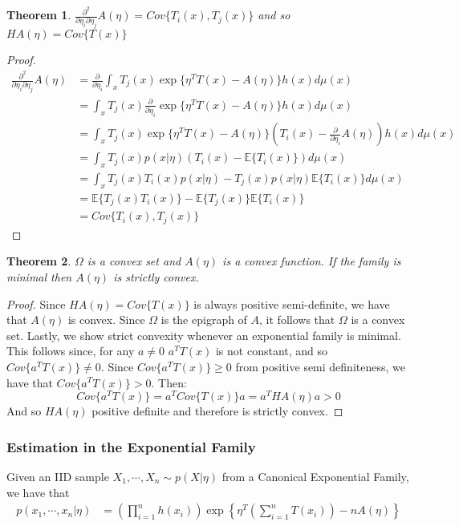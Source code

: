 \documentclass[]{article}
\theoremstyle{mattstyle}
\newtheorem{theorem}{Theorem}[section]
\theoremstyle{definition}
\begin{document}
\begin{theorem}
	$\frac{\partial^2}{\partial \eta_i \partial \eta_j}A(\eta) = Cov\{T_i(x),T_j(x)\}$ and so $HA(\eta)=Cov\{T(x)\}$
\end{theorem}
\begin{proof}
	\begin{align*}
	\frac{\partial^2}{\partial \eta_i \partial \eta_j}A(\eta) &= \frac{\partial}{\partial \eta_i}\int_x T_j(x)\exp\{ \eta^TT(x)-A(\eta)\}h(x)d\mu(x)\\
	&= \int_x T_j(x)\frac{\partial}{\partial \eta_i}\exp\{ \eta^TT(x)-A(\eta)\}h(x)d\mu(x)\\
	&= \int_x T_j(x)\exp\{ \eta^TT(x)-A(\eta)\}\left( T_i(x) - \frac{\partial}{\partial \eta_i}A(\eta) \right)h(x)d\mu(x)\\
	&= \int_x T_j(x)p(x|\eta)\left( T_i(x) - \mathbb{E}\{T_i(x)\} \right) d\mu(x)\\
	&= \int_x T_j(x)T_i(x)p(x|\eta) - T_j(x)p(x|\eta)\mathbb{E}\{T_i(x)\} d\mu(x)\\
	&= \mathbb{E}\{T_j(x)T_i(x)\} - \mathbb{E}\{T_j(x)\}\mathbb{E}\{T_i(x)\}\\
	&= Cov\{T_i(x), T_j(x)\}
	\end{align*}
\end{proof}

\begin{theorem}
	$\Omega$ is a convex set and $A(\eta)$ is a convex function. If the family is minimal then $A(\eta)$ is strictly convex.
\end{theorem}
\begin{proof}
	Since $HA(\eta)=Cov\{T(x)\}$ is always positive semi-definite, we have that $A(\eta)$ is convex. Since $\Omega$ is the epigraph of $A$, it follows that $\Omega$ is a convex set. Lastly, we show strict convexity whenever an exponential family is minimal. This follows since, for any $a\ne0$ $a^TT(x)$ is not constant, and so $Cov\{a^TT(x)\}\ne0$. Since $Cov\{a^TT(x)\}\ge 0$ from positive semi definiteness, we have that $Cov\{a^TT(x)\}>0$.
	Then:
	$$Cov\{a^TT(x)\}=a^TCov\{T(x)\}a=a^THA(\eta)a>0$$
	And so $HA(\eta)$ positive definite and therefore is strictly convex.
\end{proof}

\subsubsection{Estimation in the Exponential Family}

Given an IID sample $X_1, \cdots, X_n \sim p(X|\eta)$ from a Canonical Exponential Family, we have that
\begin{align*}
p(x_1, \cdots, x_n|\eta) &= \left(\prod_{i=1}^n h(x_i)\right) \exp\left\{ \eta^T\left(\sum_{i=1}^nT(x_i)\right) - nA(\eta)\right\}
\end{align*}
\end{document}
